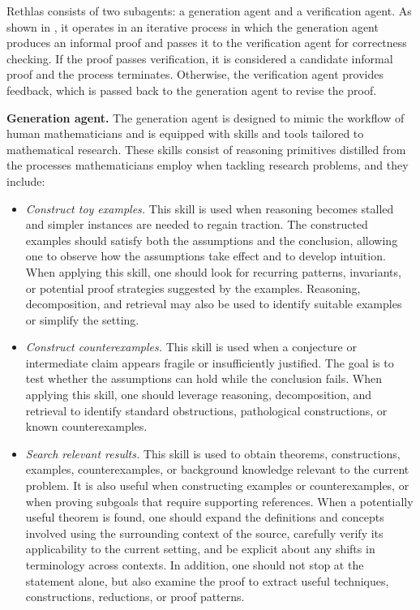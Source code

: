 \documentclass[]{pkuai4m}
\theoremstyle{plain}
\theoremstyle{definition}
\begin{document}
Rethlas consists of two subagents: a generation agent and a verification agent. As shown in , it operates in an iterative process in which the generation agent produces an informal proof and passes it to the verification agent for correctness checking. If the proof passes verification, it is considered a candidate informal proof and the process terminates. Otherwise, the verification agent provides feedback, which is passed back to the generation agent to revise the proof.

\textbf{Generation agent.} The generation agent is designed to mimic the workflow of human mathematicians and is equipped with skills and tools tailored to mathematical research. These skills consist of reasoning primitives distilled from the processes mathematicians employ when tackling research problems, and they include:
\begin{itemize}
    \item \emph{Construct toy examples.} This skill is used when reasoning becomes stalled and simpler instances are needed to regain traction. The constructed examples should satisfy both the assumptions and the conclusion, allowing one to observe how the assumptions take effect and to develop intuition. When applying this skill, one should look for recurring patterns, invariants, or potential proof strategies suggested by the examples. Reasoning, decomposition, and retrieval may also be used to identify suitable examples or simplify the setting.
    \item \emph{Construct counterexamples.} This skill is used when a conjecture or intermediate claim appears fragile or insufficiently justified. The goal is to test whether the assumptions can hold while the conclusion fails. When applying this skill, one should leverage reasoning, decomposition, and retrieval to identify standard obstructions, pathological constructions, or known counterexamples.
    \item \emph{Search relevant results.} This skill is used to obtain theorems, constructions, examples, counterexamples, or background knowledge relevant to the current problem. It is also useful when constructing examples or counterexamples, or when proving subgoals that require supporting references. When a potentially useful theorem is found, one should expand the definitions and concepts involved using the surrounding context of the source, carefully verify its applicability to the current setting, and be explicit about any shifts in terminology across contexts. In addition, one should not stop at the statement alone, but also examine the proof to extract useful techniques, constructions, reductions, or proof patterns.

\end{itemize}
\end{document}
